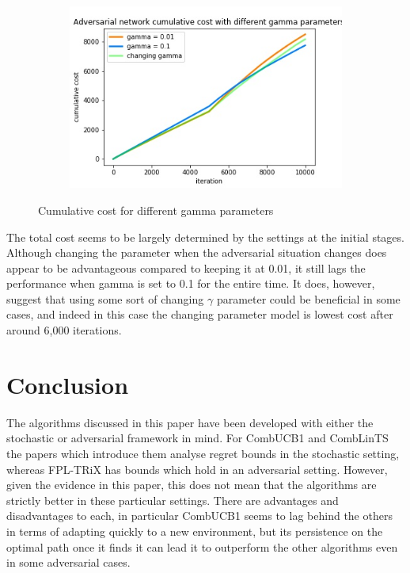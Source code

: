 \begin{figure}[ht!]
\centering
\begin{subfigure}{1.0\textwidth}
  \centering
  \includegraphics[width=10cm]{../plots/changing_gamma_cumul_cost.jpg}
\end{subfigure}
\caption{Cumulative cost for different gamma parameters}
\label{fig:gamma-effect}
\end{figure}

The total cost seems to be largely determined by the settings at the initial stages. Although changing the parameter when the adversarial situation changes does appear to be advantageous compared to keeping it at 0.01, it still lags the performance when gamma is set to 0.1 for the entire time. It does, however, suggest that using some sort of changing $\gamma$ parameter could be beneficial in some cases, and indeed in this case the changing parameter model is lowest cost after around 6,000 iterations.

\pagebreak

\section{Conclusion}

The algorithms discussed in this paper have been developed with either the stochastic or adversarial framework in mind. For CombUCB1 and CombLinTS the papers which introduce them analyse regret bounds in the stochastic setting, whereas FPL-TRiX has bounds which hold in an adversarial setting. However, given the evidence in this paper, this does not mean that the algorithms are strictly better in these particular settings. There are advantages and disadvantages to each, in particular CombUCB1 seems to lag behind the others in terms of adapting quickly to a new environment, but its persistence on the optimal path once it finds it can lead it to outperform the other algorithms even in some adversarial cases.\\

